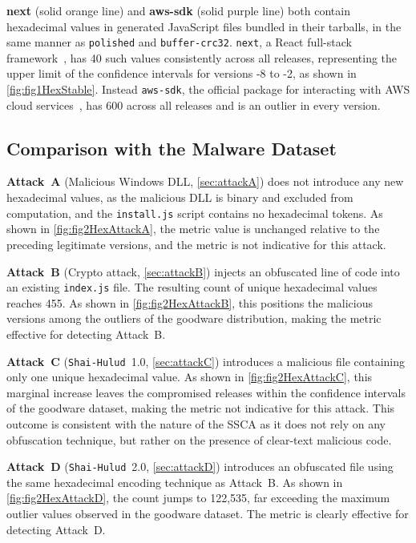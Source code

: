 \textbf{next} (solid orange line) and \textbf{aws-sdk} (solid purple line) 
both contain hexadecimal values in generated JavaScript files bundled in their tarballs, 
in the same manner as \texttt{polished} and \texttt{buffer-crc32}.
\texttt{next}, a React full-stack framework~\cite{next}, 
has 40 such values consistently across all releases,
representing the upper limit of the confidence intervals for versions -8 to -2, as shown in \cref{fig:fig1HexStable}.
Instead \texttt{aws-sdk}, the official package for interacting with \ac{AWS} cloud services~\cite{aws-sdk},
has 600 across all releases and is an outlier in every version.

\subsection{Comparison with the Malware Dataset}
\label{subsec:analysisHexComparisonMalware}

\textbf{Attack~A} (Malicious Windows DLL, \cref{sec:attackA}) does not introduce any new hexadecimal values,
as the malicious \ac{DLL} is binary and excluded from computation, and the \texttt{install.js} script contains no hexadecimal tokens.
As shown in \cref{fig:fig2HexAttackA}, the metric value is unchanged relative to the preceding legitimate versions, 
and the metric is not indicative for this attack.

\textbf{Attack~B} (Crypto attack, \cref{sec:attackB}) injects an obfuscated line of code into an existing \texttt{index.js} file.
The resulting count of unique hexadecimal values reaches 455.
As shown in \cref{fig:fig2HexAttackB}, this positions the malicious versions among the outliers of the goodware distribution, 
making the metric effective for detecting Attack~B.

\textbf{Attack~C} (\texttt{Shai-Hulud}~1.0, \cref{sec:attackC}) introduces a malicious file containing only one unique hexadecimal value.
As shown in \cref{fig:fig2HexAttackC}, this marginal increase leaves the compromised
releases within the confidence intervals of the goodware dataset, 
making the metric not indicative for this attack.
This outcome is consistent with the nature of the \ac{SSCA} as it does not rely on any obfuscation technique, 
but rather on the presence of clear-text malicious code.

\textbf{Attack~D} (\texttt{Shai-Hulud}~2.0, \cref{sec:attackD}) introduces an obfuscated file
using the same hexadecimal encoding technique as Attack~B.
As shown in \cref{fig:fig2HexAttackD}, the count jumps to 122,535, far exceeding the maximum outlier values observed in the goodware dataset.
The metric is clearly effective for detecting Attack~D.

